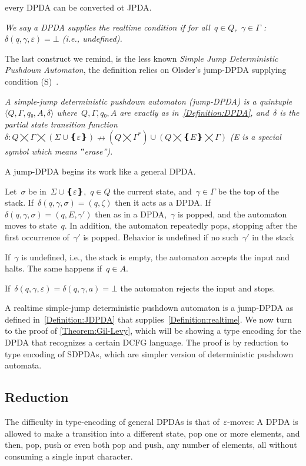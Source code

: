 every DPDA can be converted ot JPDA.
\begin{Definition}
  \label{Definition:realtime}
  \slshape
We say a DPDA supplies the \emph{realtime condition} if
  for all~$q∈Q$,~$γ∈Γ$ :~$δ(q,γ,ε)=⊥$ (i.e., undefined).
\end{Definition}

The last construct we remind, is the less known \emph{Simple Jump Deterministic Pushdown Automaton},
the definition relies on Olsder's jump-DPDA supplying condition (S)~\cite{Courcelle:77}.

\begin{Definition}
  \label{Definition:JDPDA}
  \slshape
  A \emph{simple-jump deterministic pushdown automaton} (jump-DPDA) is a quintuple~$⟨Q,Γ,q₀,A,δ⟩$
  where~$Q,Γ,q₀,A$ are exactly as in~\cref{Definition:DPDA},
  and~$δ$ is the
  \emph{partial state transition function}~$δ:Q⨉Γ⨉(Σ∪❴ε❵)↛(Q⨉Γ^*)∪(Q⨉❴E❵⨉Γ)$
  (E is a special symbol which means ‟erase”).
  \par
  A jump-DPDA begins its work like a general DPDA\@.
  \par
  Let~$σ$ be in~$Σ∪❴ε❵$,~$q∈Q$ the current state, and~$γ∈Γ$ be the top of the stack.
  If~$δ(q,γ,σ)=(q,ζ)$ then it acts as a DPDA\@.
  If~$δ(q,γ,σ)=(q,E,γ')$ then as in a DPDA,~$γ$ is popped, and the automaton
  moves to state~$q$. 
  In addition, the automaton repeatedly pops, stopping after the first occurrence of~$γ'$ is popped.
  Behavior is undefined if no such~$γ'$ in the stack 
  \par
  If~$γ$ is undefined, i.e., the stack is empty, the automaton accepts the input and halts.
  The same happens if~$q∈A$.
  \par
  If~$δ(q,γ,ε)=δ(q,γ,a)=⊥$ the automaton rejects the input and stops.
\end{Definition}

A realtime simple-jump deterministic pushdown automaton is a jump-DPDA
  as defined in~\cref{Definition:JDPDA}
  that supplies~\cref{Definition:realtime}.
We now turn to the proof of \cref{Theorem:Gil-Levy}, which will be showing a type encoding for the DPDA that recognizes a certain DCFG language.
The proof is by reduction to type encoding of SDPDAs, which are simpler version of deterministic pushdown automata.

\subsection{Reduction}
The difficulty in type-encoding of general DPDAs is that of~$ε$-moves:
A DPDA is allowed to make a transition into a different state,
  pop one or more elements, and then, pop, push or even both pop and push, any number of elements,
  all without consuming a single input character.

